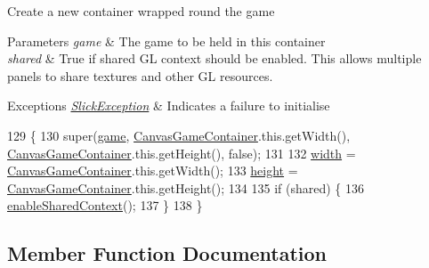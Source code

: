 Create a new container wrapped round the game


\begin{DoxyParams}{Parameters}
{\em game} & The game to be held in this container \\
\hline
{\em shared} & True if shared GL context should be enabled. This allows multiple panels to share textures and other GL resources. \\
\hline
\end{DoxyParams}

\begin{DoxyExceptions}{Exceptions}
{\em \mbox{\hyperlink{classorg_1_1newdawn_1_1slick_1_1_slick_exception}{Slick\+Exception}}} & Indicates a failure to initialise \\
\hline
\end{DoxyExceptions}

\begin{DoxyCode}
129                                                                           \{
130             super(\mbox{\hyperlink{classorg_1_1newdawn_1_1slick_1_1_game_container_a6a38bb26e45e1c884940caf35c7cfcdc}{game}}, \mbox{\hyperlink{classorg_1_1newdawn_1_1slick_1_1_canvas_game_container_a078feee2c69d77cabd1f09b87d055923}{CanvasGameContainer}}.this.getWidth(), 
      \mbox{\hyperlink{classorg_1_1newdawn_1_1slick_1_1_canvas_game_container_a078feee2c69d77cabd1f09b87d055923}{CanvasGameContainer}}.this.getHeight(), \textcolor{keyword}{false});
131 
132             \mbox{\hyperlink{classorg_1_1newdawn_1_1slick_1_1_game_container_a8c65160202b9f5aafde3fcf03e6155c9}{width}} = \mbox{\hyperlink{classorg_1_1newdawn_1_1slick_1_1_canvas_game_container_a078feee2c69d77cabd1f09b87d055923}{CanvasGameContainer}}.this.getWidth();
133             \mbox{\hyperlink{classorg_1_1newdawn_1_1slick_1_1_game_container_aac7312a21bbcaabec14be965c683d970}{height}} = \mbox{\hyperlink{classorg_1_1newdawn_1_1slick_1_1_canvas_game_container_a078feee2c69d77cabd1f09b87d055923}{CanvasGameContainer}}.this.getHeight();
134             
135             \textcolor{keywordflow}{if} (shared) \{
136                 \mbox{\hyperlink{classorg_1_1newdawn_1_1slick_1_1_game_container_a5cc7494b95d6266057fc755a8a4f7e60}{enableSharedContext}}();
137             \}
138         \}
\end{DoxyCode}


\subsection{Member Function Documentation}
\mbox{\label{classorg_1_1newdawn_1_1slick_1_1_canvas_game_container_1_1_container_a23325dcc30cb88191ac8f0382a2fc611}} 
